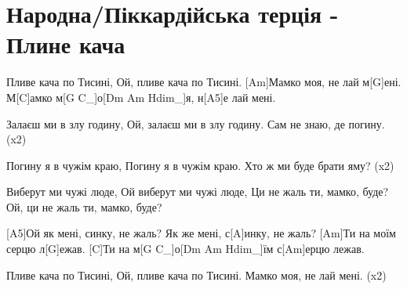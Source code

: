 \section{Народна/Піккардійська терція - Плине кача}
\begin{guitar}
[A5] Пливе кача по Тисині,
Ой, пливе кача по Тисині.
[Am]Мамко моя, не лай м[G]ені.
М[C]амко м[G C_]о[Dm Am Hdim_]я, н[A5]е лай мені.

Залаєш ми в злу годину,
Ой, залаєш ми в злу годину.
Сам не знаю, де погину.   (x2)

Погину я в чужім краю,
Погину я в чужім краю.
Хто ж ми буде брати яму?  (x2)

Виберут ми чужі люде,
Ой виберут ми чужі люде,
Ци не жаль ти, мамко, буде?
Ой, ци не жаль ти, мамко, буде?

[A5]Ой як мені, синку, не жаль?
Як же мені, с[A]инку, не жаль?
[Am]Ти на моїм серцю л[G]ежав.
[C]Ти на м[G C_]о[Dm Am Hdim_]їм с[Am]ерцю лежав.

Пливе кача по Тисині,
Ой, пливе кача по Тисині.
Мамко моя, не лай мені.   (x2)
\end{guitar}
